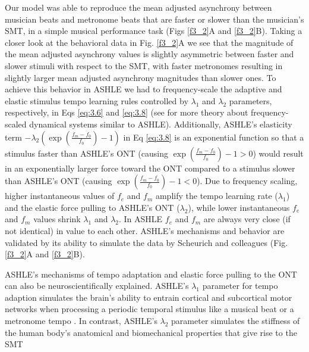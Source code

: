 \documentclass{report}
\begin{document}
Our model was able to reproduce the mean adjusted asynchrony between musician beats and metronome beats that are faster or slower than the musician's SMT, in a simple musical performance task (Figs \ref{f3_2}A and \ref{f3_2}B). Taking a closer look at the behavioral data in Fig.{} \ref{f3_2}A we see that the magnitude of the mean adjusted asynchrony values is slightly asymmetric between faster and slower stimuli with respect to the SMT, with faster metronomes resulting in slightly larger mean adjusted asynchrony magnitudes than slower ones. To achieve this behavior in ASHLE we had to frequency-scale the adaptive and elastic stimulus tempo learning rules controlled by $\lambda_1$ and $\lambda_2$ parameters, respectively, in Eqs \eqref{eq:3.6} and \eqref{eq:3.8} (see \cite{kim2015signal, large2010canonical} for more theory about frequency-scaled dynamical systems similar to ASHLE). Additionally, ASHLE's elasticity term $-\lambda_2\left(\exp\left(\frac{f_m-f_0}{f_0}\right)-1\right)$ in Eq \eqref{eq:3.8} is an exponential function so that a stimulus faster than ASHLE's ONT (causing $\exp\left(\frac{f_m-f_0}{f_0}\right)-1>0$) would result in an exponentially larger force toward the ONT compared to a stimulus slower than ASHLE's ONT (causing $\exp\left(\frac{f_m-f_0}{f_0}\right)-1<0$). Due to frequency scaling, higher instantaneous values of $f_e$ and $f_m$ amplify the tempo learning rate ($\lambda_1$) and the elastic force pulling to ASHLE's ONT ($\lambda_2$), while lower instantaneous $f_e$ and $f_m$ values shrink $\lambda_1$ and $\lambda_2$. In ASHLE $f_e$ and $f_m$ are always very close (if not identical) in value to each other. ASHLE's mechanisms and behavior are validated by its ability to simulate the data by Scheurich and colleagues \cite{scheurich2018tapping} (Fig.{} \ref{f3_2}A and \ref{f3_2}B).

ASHLE's mechanisms of tempo adaptation and elastic force pulling to the ONT can also be neuroscientifically explained. ASHLE's $\lambda_1$ parameter for tempo adaption simulates the brain's ability to entrain cortical and subcortical motor networks when processing a periodic temporal stimulus like a musical beat or a metronome tempo \cite{large2015neural}. In contrast, ASHLE's $\lambda_2$ parameter simulates the stiffness of the human body's anatomical and biomechanical properties that give rise to the SMT \cite{goodman2000advantages}
\end{document}
